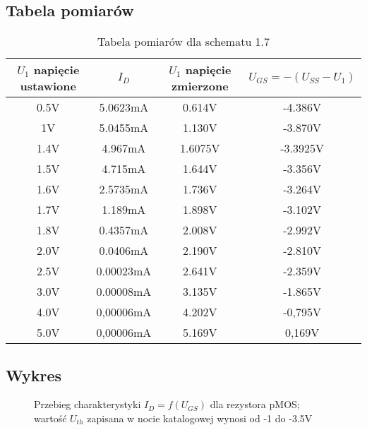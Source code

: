 \documentclass[polish,a4paper]{article}
\begin{document}
\subsection{Tabela pomiarów}
\begin{table}[H]
\centering
\begin{tabular}{|c|c|c|c|}
\hline
$U_{1}$ napięcie ustawione & $I_{D}  $ & $U_{1}$ napięcie zmierzone & $U_{GS}=-(U_{SS}-U_{1})$\\
\hline 
0.5V & 5.0623mA &0.614V & -4.386V \\
\hline
1V & 5.0455mA & 1.130V &  -3.870V\\
\hline
1.4V & 4.967mA & 1.6075V &  -3.3925V\\
\hline
1.5V & 4.715mA & 1.644V &  -3.356V\\
\hline
1.6V & 2.5735mA & 1.736V &  -3.264V\\
\hline
1.7V & 1.189mA & 1.898V &  -3.102V\\
\hline
1.8V & 0.4357mA & 2.008V &  -2.992V\\
\hline
2.0V & 0.0406mA & 2.190V &  -2.810V\\
\hline
2.5V & 0.00023mA & 2.641V &  -2.359V\\
\hline
3.0V & 0.00008mA & 3.135V &  -1.865V\\
\hline
4.0V & 0,00006mA & 4.202V &  -0,795V\\
\hline
5.0V & 0,00006mA & 5.169V &  0,169V\\
\hline

\end{tabular}
\caption{Tabela pomiarów dla schematu 1.7}
\end{table}

\subsection{Wykres}


\begin{figure}[H]
\centering
{}
\caption{Przebieg charakterystyki $I_{D}=f(U_{GS})$ dla rezystora pMOS; wartość $U_{th}$ zapisana w nocie katalogowej wynosi od -1 do -3.5V }
\end{figure}
\end{document}
